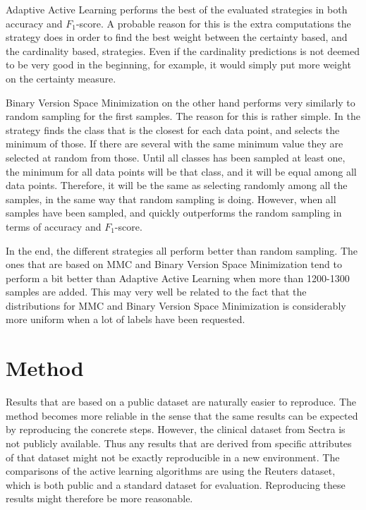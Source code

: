 Adaptive Active Learning performs the best of the evaluated strategies in both accuracy and $F_1$-score. 
A probable reason for this is the extra computations the strategy does in order to find the best weight between the certainty based, and the cardinality based, strategies.
Even if the cardinality predictions is not deemed to be very good in the beginning, for example, it would simply put more weight on the certainty measure.

Binary Version Space Minimization on the other hand performs very similarly to random sampling for the first samples.
The reason for this is rather simple.
In the strategy finds the class that is the closest for each data point, and selects the minimum of those.
If there are several with the same minimum value they are selected at random from those.
Until all classes has been sampled at least one, the minimum for all data points will be that class, and it will be equal among all data points.
Therefore, it will be the same as selecting randomly among all the samples, in the same way that random sampling is doing.
However, when all samples have been sampled, and quickly outperforms the random sampling in terms of accuracy and $F_1$-score.

In the end, the different strategies all perform better than random sampling.
The ones that are based on MMC and Binary Version Space Minimization tend to perform a bit better than Adaptive Active Learning when more than 1200-1300 samples are added.
This may very well be related to the fact that the distributions for MMC and Binary Version Space Minimization is considerably more uniform when a lot of labels have been requested.



\section{Method}
\label{sec:discussion-method}

Results that are based on a public dataset are naturally easier to reproduce.
The method becomes more reliable in the sense that the same results can be expected by reproducing the concrete steps.
However, the clinical dataset from Sectra is not publicly available.
Thus any results that are derived from specific attributes of that dataset might not be exactly reproducible in a new environment.
The comparisons of the active learning algorithms are using the Reuters dataset, which is both public and a standard dataset for evaluation.
Reproducing these results might therefore be more reasonable.

